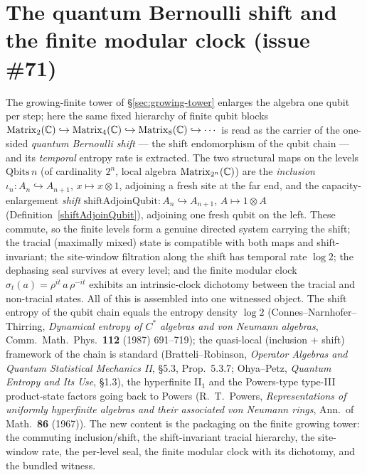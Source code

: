 \section{The quantum Bernoulli shift and the finite modular clock (issue \#71)}
\label{sec:quantum-bernoulli}

The growing-finite tower of \S\ref{sec:growing-tower} enlarges the algebra one qubit per step; here
the same fixed hierarchy of finite qubit blocks
\(\operatorname{Matrix}_2(\mathbb{C})\hookrightarrow\operatorname{Matrix}_4(\mathbb{C})\hookrightarrow\operatorname{Matrix}_8(\mathbb{C})\hookrightarrow\cdots\) is read
as the carrier of the one-sided \emph{quantum Bernoulli shift} --- the shift endomorphism of the
qubit chain --- and its \emph{temporal} entropy rate is extracted. The two structural maps on the
levels \(\mathrm{Qbits}\,n\) (of cardinality \(2^{n}\), local algebra \(\operatorname{Matrix}_{2^{n}}(\mathbb{C})\)) are the
\emph{inclusion} \(\iota_n:A_n\hookrightarrow A_{n+1}\), \(x\mapsto x\otimes 1\), adjoining a fresh
site at the far end, and the capacity-enlargement \emph{shift}
\(\mathrm{shiftAdjoinQubit}:A_n\hookrightarrow A_{n+1}\), \(A\mapsto 1\otimes A\)
(Definition~\ref{shiftAdjoinQubit}), adjoining one fresh qubit on the left. These commute, so the
finite levels form a genuine directed system carrying the shift; the tracial (maximally mixed) state
is compatible with both maps and shift-invariant; the site-window filtration along the shift has
temporal rate \(\log 2\); the dephasing seal survives at every level; and the finite modular clock
\(\sigma_t(a)=\rho^{it}\,a\,\rho^{-it}\) exhibits an intrinsic-clock dichotomy between the tracial and
non-tracial states. All of this is assembled into one witnessed object. The shift entropy of the
qubit chain equals the entropy density \(\log 2\) (Connes--Narnhofer--Thirring, \emph{Dynamical
entropy of \(C^{*}\) algebras and von Neumann algebras}, Comm.\ Math.\ Phys.\ \textbf{112} (1987)
691--719); the quasi-local (inclusion \(+\) shift) framework of the chain is standard
(Bratteli--Robinson, \emph{Operator Algebras and Quantum Statistical Mechanics II}, \S5.3, Prop.\
5.3.7; Ohya--Petz, \emph{Quantum Entropy and Its Use}, \S1.3), the hyperfinite II\(_1\) and the
Powers-type type-III product-state factors going back to Powers (R.\ T.\ Powers, \emph{Representations
of uniformly hyperfinite algebras and their associated von Neumann rings}, Ann.\ of Math.\
\textbf{86} (1967)). The new content is the packaging on the finite growing tower: the commuting
inclusion/shift, the shift-invariant tracial hierarchy, the site-window rate, the per-level seal, the
finite modular clock with its dichotomy, and the bundled witness.

